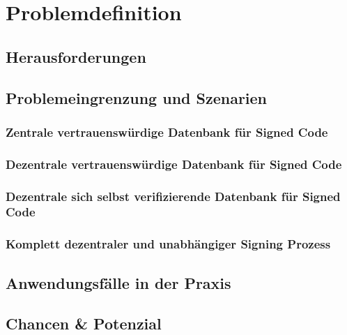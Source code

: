 \section{Problemdefinition}
\tbd

\subsection{Herausforderungen}
\tbd

\subsection{Problemeingrenzung und Szenarien}
\subsubsection{Zentrale vertrauenswürdige Datenbank für Signed Code}
\tbd

\subsubsection{Dezentrale vertrauenswürdige Datenbank für Signed Code}
\tbd

\subsubsection{Dezentrale sich selbst verifizierende Datenbank für Signed Code}
\tbd

\subsubsection{Komplett dezentraler und unabhängiger Signing Prozess}
\tbd


\subsection{Anwendungsfälle in der Praxis}
\tbd

\subsection{Chancen \& Potenzial}
\tbd
